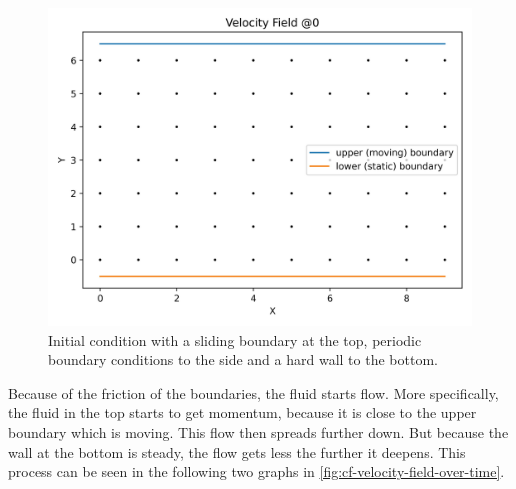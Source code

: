 \begin{figure}[h!]
    \begin{center}
        \includegraphics[width=0.5\linewidth]{graphs/CouetteFlow/velocity_field_couette_flow_0}
        \caption{Initial condition with a sliding boundary at the top, periodic boundary conditions to the side and a hard wall to the bottom.}
        \label{fig:cf-initial-condition}
    \end{center}
\end{figure}

Because of the friction of the boundaries, the fluid starts flow.
More specifically, the fluid in the top starts to get momentum, because it is close to the upper boundary which is moving.
This flow then spreads further down.
But because the wall at the bottom is steady, the flow gets less the further it deepens.
This process can be seen in the following two graphs in \cref{fig:cf-velocity-field-over-time}.


